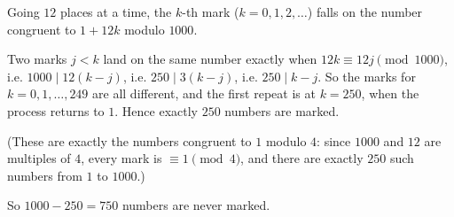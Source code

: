 Going $12$ places at a time, the $k$-th mark ($k=0,1,2,\dots$) falls on the number congruent to $1+12k$ modulo $1000$.

Two marks $j<k$ land on the same number exactly when $12k\equiv12j\pmod{1000}$, i.e. $1000\mid12(k-j)$, i.e. $250\mid 3(k-j)$, i.e. $250\mid k-j$. So the marks for $k=0,1,\dots,249$ are all different, and the first repeat is at $k=250$, when the process returns to $1$. Hence exactly $250$ numbers are marked.

(These are exactly the numbers congruent to $1$ modulo $4$: since $1000$ and $12$ are multiples of $4$, every mark is $\equiv1\pmod4$, and there are exactly $250$ such numbers from $1$ to $1000$.)

So $1000-250=\boxed{750}$ numbers are never marked.

